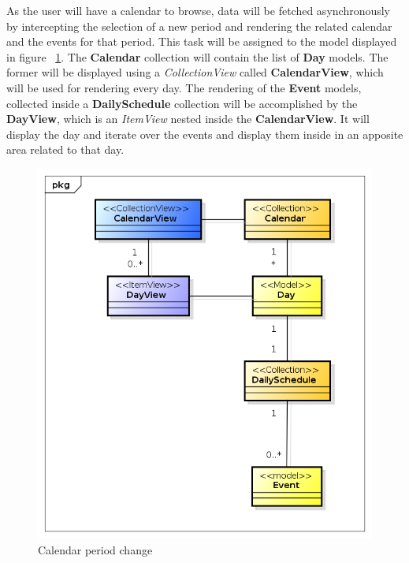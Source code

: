 As the user will have a calendar to browse, data will be fetched asynchronously by intercepting the selection of a new period and rendering the related calendar and the events for that period. This task will be assigned to the model displayed in figure~
\ref{fig:calendarBCE}.
The \textbf{Calendar} collection will contain the list of \textbf{Day} models. The former will be displayed using a \textit{CollectionView} called \textbf{CalendarView}, which will be used for rendering every day. The rendering of the \textbf{Event} models, collected inside a \textbf{DailySchedule} collection will be accomplished by the \textbf{DayView}, which is an \textit{ItemView} nested inside the \textbf{CalendarView}. It will display the day and iterate over the events and display them inside in an apposite area related to that day.
\begin{center}
 \begin{figure}[H]
    \includegraphics[width=1\textwidth]{../MVCDiagram/MVCBackbone/UserCalendar.png}
    \caption{Calendar period change}
     \label{fig:calendarBCE}
     \end{figure}
   \end{center}  

